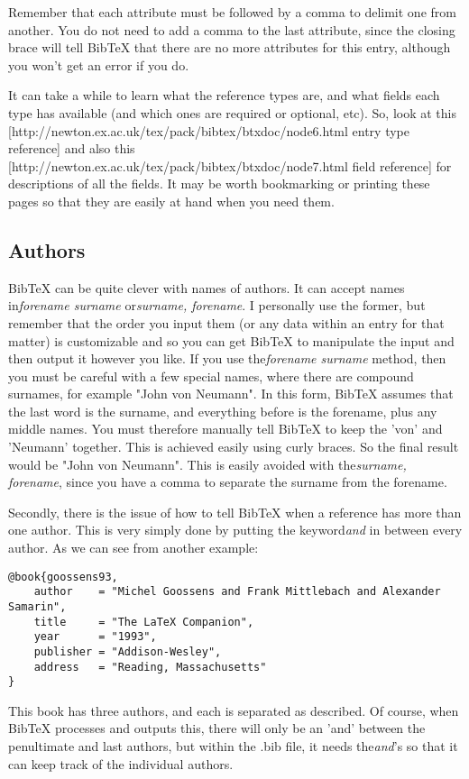 Remember that each attribute must be followed by a comma to delimit one from
another. You do not need to add a comma to the last attribute, since the
closing brace will tell BibTeX that there are no more attributes for this
entry, although you won't get an error if you do.

It can take a while to learn what the reference types are, and what fields each
type has available (and which ones are required or optional, etc). So, look at
this [http://newton.ex.ac.uk/tex/pack/bibtex/btxdoc/node6.html entry type
reference] and also this
[http://newton.ex.ac.uk/tex/pack/bibtex/btxdoc/node7.html field reference] for
descriptions of all the fields. It may be worth bookmarking or printing these
pages so that they are easily at hand when you need them.

\subsection{Authors}
BibTeX can be quite clever with names of authors. It can accept names
in\textit{forename surname} or\textit{surname, forename}. I personally use the
former, but remember that the order you input them (or any data within an entry
for that matter) is customizable and so you can get BibTeX to manipulate the
input and then output it however you like. If you use the\textit{forename
surname} method, then you must be careful with a few special names, where there
are compound surnames, for example "John von Neumann". In this form, BibTeX
assumes that the last word is the surname, and everything before is the
forename, plus any middle names. You must therefore manually tell BibTeX to
keep the 'von' and 'Neumann' together. This is achieved easily using curly
braces. So the final result would be "John {von Neumann}".  This is easily
avoided with the\textit{surname, forename}, since you have a comma to separate
the surname from the forename.

Secondly, there is the issue of how to tell BibTeX when a reference has more
than one author. This is very simply done by putting the keyword\textit{and} in
between every author. As we can see from another example:

\begin{lstlisting}
@book{goossens93,
    author    = "Michel Goossens and Frank Mittlebach and Alexander Samarin",
    title     = "The LaTeX Companion",
    year      = "1993",
    publisher = "Addison-Wesley",
    address   = "Reading, Massachusetts"
}
\end{lstlisting}
This book has three authors, and each is separated as described. Of course,
when BibTeX processes and outputs this, there will only be an 'and' between the
penultimate and last authors, but within the .bib file, it needs
the\textit{and}'s so that it can keep track of the individual authors.

